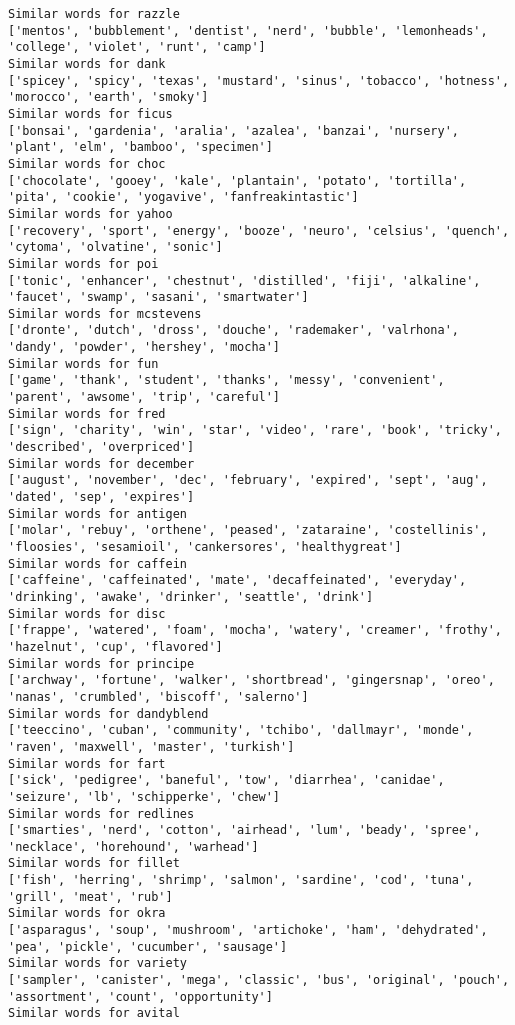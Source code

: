 \documentclass[11pt]{article}
\begin{document}
\begin{Verbatim}[commandchars=\\\{\}]
Similar words for razzle
['mentos', 'bubblement', 'dentist', 'nerd', 'bubble', 'lemonheads', 'college', 'violet', 'runt', 'camp']
Similar words for dank
['spicey', 'spicy', 'texas', 'mustard', 'sinus', 'tobacco', 'hotness', 'morocco', 'earth', 'smoky']
Similar words for ficus
['bonsai', 'gardenia', 'aralia', 'azalea', 'banzai', 'nursery', 'plant', 'elm', 'bamboo', 'specimen']
Similar words for choc
['chocolate', 'gooey', 'kale', 'plantain', 'potato', 'tortilla', 'pita', 'cookie', 'yogavive', 'fanfreakintastic']
Similar words for yahoo
['recovery', 'sport', 'energy', 'booze', 'neuro', 'celsius', 'quench', 'cytoma', 'olvatine', 'sonic']
Similar words for poi
['tonic', 'enhancer', 'chestnut', 'distilled', 'fiji', 'alkaline', 'faucet', 'swamp', 'sasani', 'smartwater']
Similar words for mcstevens
['dronte', 'dutch', 'dross', 'douche', 'rademaker', 'valrhona', 'dandy', 'powder', 'hershey', 'mocha']
Similar words for fun
['game', 'thank', 'student', 'thanks', 'messy', 'convenient', 'parent', 'awsome', 'trip', 'careful']
Similar words for fred
['sign', 'charity', 'win', 'star', 'video', 'rare', 'book', 'tricky', 'described', 'overpriced']
Similar words for december
['august', 'november', 'dec', 'february', 'expired', 'sept', 'aug', 'dated', 'sep', 'expires']
Similar words for antigen
['molar', 'rebuy', 'orthene', 'peased', 'zataraine', 'costellinis', 'floosies', 'sesamioil', 'cankersores', 'healthygreat']
Similar words for caffein
['caffeine', 'caffeinated', 'mate', 'decaffeinated', 'everyday', 'drinking', 'awake', 'drinker', 'seattle', 'drink']
Similar words for disc
['frappe', 'watered', 'foam', 'mocha', 'watery', 'creamer', 'frothy', 'hazelnut', 'cup', 'flavored']
Similar words for principe
['archway', 'fortune', 'walker', 'shortbread', 'gingersnap', 'oreo', 'nanas', 'crumbled', 'biscoff', 'salerno']
Similar words for dandyblend
['teeccino', 'cuban', 'community', 'tchibo', 'dallmayr', 'monde', 'raven', 'maxwell', 'master', 'turkish']
Similar words for fart
['sick', 'pedigree', 'baneful', 'tow', 'diarrhea', 'canidae', 'seizure', 'lb', 'schipperke', 'chew']
Similar words for redlines
['smarties', 'nerd', 'cotton', 'airhead', 'lum', 'beady', 'spree', 'necklace', 'horehound', 'warhead']
Similar words for fillet
['fish', 'herring', 'shrimp', 'salmon', 'sardine', 'cod', 'tuna', 'grill', 'meat', 'rub']
Similar words for okra
['asparagus', 'soup', 'mushroom', 'artichoke', 'ham', 'dehydrated', 'pea', 'pickle', 'cucumber', 'sausage']
Similar words for variety
['sampler', 'canister', 'mega', 'classic', 'bus', 'original', 'pouch', 'assortment', 'count', 'opportunity']
Similar words for avital

\end{Verbatim}
\end{document}
